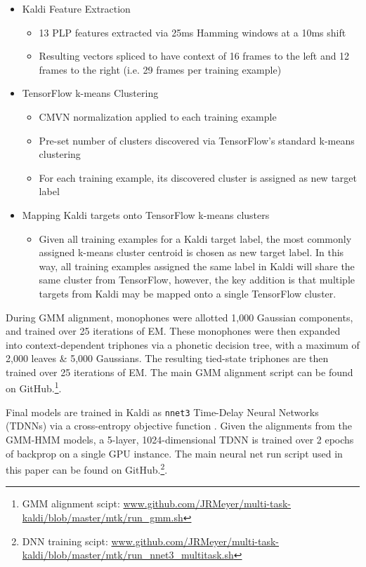 \documentclass[a4paper]{article}
\begin{document}
\begin{itemize}
\item Kaldi Feature Extraction
  \begin{itemize}
  \item 13 PLP features extracted via 25ms Hamming windows at a 10ms shift
  \item Resulting vectors spliced to have context of 16 frames to the left and 12 frames to the right (i.e. 29 frames per training example)
  \end{itemize}

\item TensorFlow k-means Clustering
  \begin{itemize}
  \item CMVN normalization applied to each training example
  \item Pre-set number of clusters discovered via TensorFlow's standard k-means clustering
  \item For each training example, its discovered cluster is assigned as new target label
  \end{itemize}

\item Mapping Kaldi targets onto TensorFlow k-means clusters
   \begin{itemize}
   \item Given all training examples for a Kaldi target label, the most commonly assigned k-means cluster centroid is chosen as new target label. In this way, all training examples assigned the same label in Kaldi will share the same cluster from TensorFlow, however, the key addition is that multiple targets from Kaldi may be mapped onto a single TensorFlow cluster.
  \end{itemize} 
\end{itemize}

During GMM alignment, monophones were allotted 1,000 Gaussian components, and trained over 25 iterations of EM. These monophones were then expanded into context-dependent triphones via a phonetic decision tree, with a maximum of 2,000 leaves \& 5,000 Gaussians. The resulting tied-state triphones are then trained over 25 iterations of EM. The main GMM alignment script can be found on GitHub.\footnote{GMM alignment scipt: \url{www.github.com/JRMeyer/multi-task-kaldi/blob/master/mtk/run_gmm.sh}}.

Final models are trained in Kaldi as \texttt{nnet3} Time-Delay Neural Networks (TDNNs) via a cross-entropy objective function \cite{povey2011,peddinti2015}. Given the alignments from the GMM-HMM models, a 5-layer, 1024-dimensional TDNN is trained over 2 epochs of backprop on a single GPU instance. The main neural net run script used in this paper can be found on GitHub.\footnote{DNN training scipt: \url{www.github.com/JRMeyer/multi-task-kaldi/blob/master/mtk/run_nnet3_multitask.sh}}.
\end{document}
